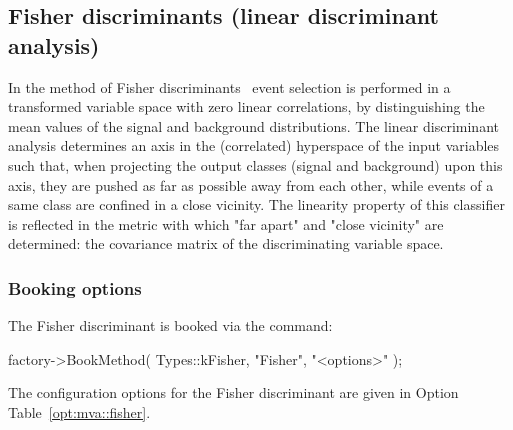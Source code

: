 \subsection{Fisher discriminants (linear discriminant 
            analysis)}
\label{sec:fisher}

In the method of Fisher discriminants~\cite{Fisher} 
event selection is performed in a transformed variable space with zero
linear correlations, by distinguishing the mean values of the signal
and background distributions.
The linear discriminant analysis
determines an axis in the (correlated) hyperspace of the input
variables such that, when projecting the output classes (signal and
background) upon this axis, they are pushed as far as possible away
from each other, while events of a same class are confined in a close
vicinity. The linearity property of this classifier is reflected in the
metric with which "far apart" and "close vicinity" are determined: the
covariance matrix of the discriminating variable space.

\subsubsection{Booking options}

The Fisher discriminant is booked via the command:
\begin{codeexample}
\begin{tmvacode}
factory->BookMethod( Types::kFisher, "Fisher", "<options>" );
\end{tmvacode}
\caption[.]{\codeexampleCaptionSize Booking of the Fisher discriminant: the first 
		   argument is a predefined enumerator, the second argument is a user-defined 
		   string identifier, and the third argument is the configuration options string.
         Individual options are separated by a ':'. 
         See Sec.~\ref{sec:usingtmva:booking} for more information on the booking.}
\end{codeexample}
The configuration options for the Fisher discriminant are given in Option Table~\ref{opt:mva::fisher}.


